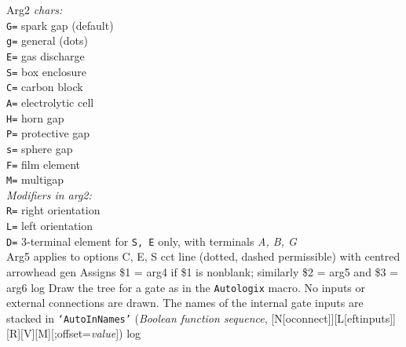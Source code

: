 {                                Arg2 {\sl chars:}\\
                                   {\tt G=} spark gap (default)\\
                                   {\tt g=} general (dots)\\
                                   {\tt E=} gas discharge\\
                                   {\tt S=} box enclosure\\
                                   {\tt C=} carbon block\\
                                   {\tt A=} electrolytic cell\\
                                   {\tt H=} horn gap\\
                                   {\tt P=} protective gap\\
                                   {\tt s=} sphere gap\\
                                   {\tt F=} film element\\
                                   {\tt M=} multigap\\
                                 {\sl Modifiers in arg2:}\\
                                   {\tt R=} right orientation\\
                                   {\tt L=} left orientation\\
                                   {\tt D=} 3-terminal element for {\tt S, E}
                                      only, with terminals {\sl A, B, G}\\
                                   Arg5 applies to options C, E, S
   }%
%
  {cct}%
  {line (dotted, dashed permissible) with centred arrowhead
    }%
%
  {gen}%
  {Assigns \$1 = arg4 if \$1 is nonblank; similarly \$2 = arg5 and \$3 = arg6}%
%
  {log}%
  {Draw the tree for a gate as in the {\tt Autologix} macro.  No inputs
   or external connections are drawn.  The names of the internal gate
   inputs are stacked in {\tt `AutoInNames'}}%
%
 {({\sl Boolean function sequence},%
    [N[oconnect]][L[eftinputs]][R][V][M][;offset={\sl value}])}%
  {log}%
